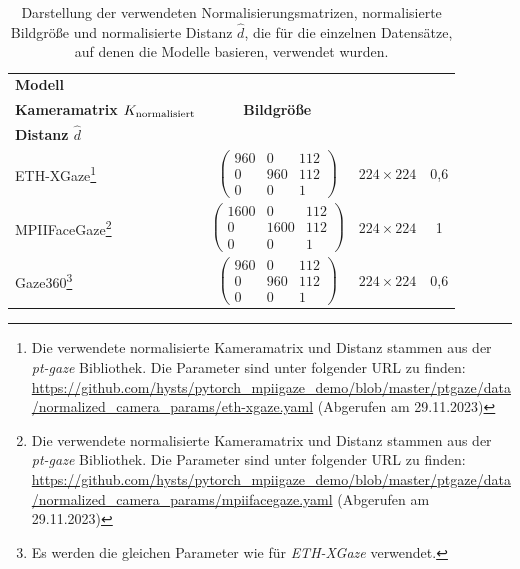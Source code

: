 \begin{table}[]
    \centering
    \begin{tabular}{l c c c}
    \toprule
        \textbf{Modell} & \makecell{\textbf{Normalisierte}\\ \textbf{Kameramatrix $K_{\text{normalisiert}}$}}  & \textbf{Bildgröße} & \makecell{\textbf{Normalisierte}\\ \textbf{Distanz $\hat{d}$}}  \\ 
        \midrule
        ETH-XGaze\footnote{Die verwendete normalisierte Kameramatrix und Distanz stammen aus der \textit{pt-gaze} Bibliothek. Die Parameter sind unter folgender URL zu finden: \url{https://github.com/hysts/pytorch_mpiigaze_demo/blob/master/ptgaze/data/normalized_camera_params/eth-xgaze.yaml} (Abgerufen am 29.11.2023)} & $\begin{pmatrix}960 & 0 & 112 \\0 & 960 & 112 \\ 0 & 0 & 1 \end{pmatrix}$ & $224 \times 224$ & 0,6 \\
        MPIIFaceGaze\footnote{Die verwendete normalisierte Kameramatrix und Distanz stammen aus der \textit{pt-gaze} Bibliothek. Die Parameter sind unter folgender URL zu finden: \url{https://github.com/hysts/pytorch_mpiigaze_demo/blob/master/ptgaze/data/normalized_camera_params/mpiifacegaze.yaml} (Abgerufen am 29.11.2023)} & $\begin{pmatrix}1600 & 0 & 112 \\0 & 1600 & 112 \\ 0 & 0 & 1 \end{pmatrix}$ & $224 \times 224$ & 1\\
        Gaze360\footnote{Es werden die gleichen Parameter wie für \textit{ETH-XGaze} verwendet.} & $\begin{pmatrix}960 & 0 & 112 \\0 & 960 & 112 \\ 0 & 0 & 1 \end{pmatrix}$ & $224 \times 224$ & 0,6 \\
        \bottomrule
        
    \end{tabular}
    \caption{Darstellung der verwendeten Normalisierungsmatrizen, normalisierte Bildgröße und normalisierte Distanz $\hat{d}$, die für die einzelnen Datensätze, auf denen die Modelle basieren, verwendet wurden.}
    \label{tab:implementation:gaze:camera:configs}
\end{table}

